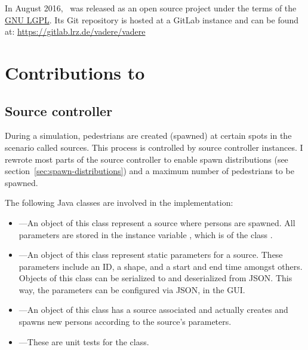 In August 2016, \vadere\ was released as an open source project under the
terms of the \href{http://www.gnu.org/licenses/lgpl.html}{GNU LGPL}.
Its Git repository is hosted at a GitLab instance and can be found at:
\url{https://gitlab.lrz.de/vadere/vadere}

\section{Contributions to \vadere}

\subsection{Source controller}
\label{sec:source-controller}

During a simulation, pedestrians are created (spawned) at certain spots in
the scenario called sources.
This process is controlled by source controller instances.
I rewrote most parts of the source controller to enable spawn distributions
(see section~\ref{sec:spawn-distributions}) and a maximum number of pedestrians to
be spawned.

The following Java classes are involved in the implementation:

\begin{itemize}

  \item {}---An object of this class represent a source where
    persons are spawned.
    All parameters are stored in the instance variable , which
    is of the class .

  \item {}---An object of this class represent static
    parameters for a source.
    These parameters include an \acs{ID}, a shape, and a start and end time
    amongst others.
    Objects of this class can be serialized to and deserialized from \acs{JSON}.
    This way, the parameters can be configured via \acs{JSON}, \eg in the
    \acs{GUI}.

  \item {}---An object of this class has a source
    associated and actually creates and spawns new persons according to the
    source's parameters.

  \item {}---These are unit tests for the
     class.

\end{itemize}

